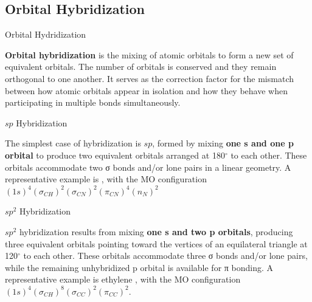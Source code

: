 \documentclass[10pt]{article}
\begin{document}
  \subsection{Orbital Hybridization}
    
    \begin{core}{Orbital Hydridization}

      \textbf{Orbital hybridization} is the mixing of atomic orbitals to form a new set of equivalent orbitals. The number of orbitals is conserved and they remain orthogonal to one another. It serves as the correction factor for the mismatch between how atomic orbitals appear in isolation and how they behave when participating in multiple bonds simultaneously.

    \end{core}

    \begin{core}{$sp$ Hybridization}


      The simplest case of hybridization is $sp$, formed by mixing \textbf{one s and one p orbital} to produce two equivalent orbitals arranged at 180$^\circ$ to each other. These orbitals accommodate two σ bonds and/or lone pairs in a linear geometry. A representative example is , with the MO configuration $(1s)^4(σ_{CH})^2(σ_{CN})^2(π_{CN})^4(n_{N})^2$


    \end{core}

    \begin{core}{$sp^2$ Hybridization}

      $sp^2$ hybridization results from mixing \textbf{one s and two p orbitals}, producing three equivalent orbitals pointing toward the vertices of an equilateral triangle at 120$^\circ$ to each other. These orbitals accommodate three σ bonds and/or lone pairs, while the remaining unhybridized p orbital is available for π bonding. A representative example is ethylene , with the MO configuration $(1s)^4(σ_{CH})^8(σ_{CC})^2(π_{CC})^2$.


    \end{core}
\end{document}
